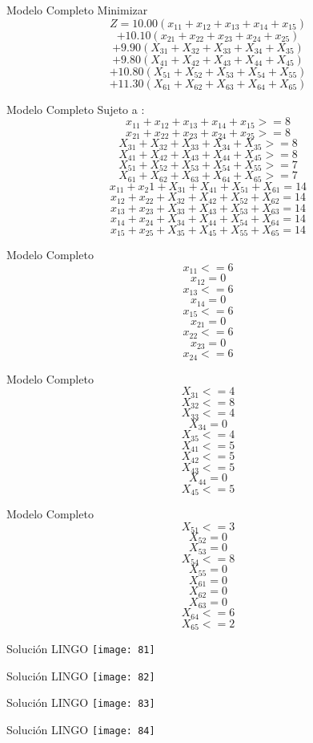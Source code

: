\documentclass{beamer}
\begin{document}
\begin{frame}[fragile]{Modelo Completo}
Minimizar\\
    \[Z = 10.00 (x_{11} + x_{12} +x_{13}+x_{14} +x_{15}) \]
      \[+ 10.10 (x_{21} + x_{22} +x_{23}+x_{24} + x_{25})\]
      \[+  9.90 (X_{31} + X_{32} +X_{33}+X_{34} +X_{35})\]
      \[+ 9.80  (X_{41} + X_{42} +X_{43}+X_{44} +X_{45})\]
      \[+ 10.80  (X_{51} + X_{52} +X_{53}+X_{54} +X_{55})\]
      \[+ 11.30  (X_{61} + X_{62} +X_{63}+X_{64} +X_{65})\]

\end{frame}

\begin{frame}[fragile]{Modelo Completo}
Sujeto a :\\
\[x_{11} + x_{12} +x_{13}+x_{14} +x_{15} >=8\]
\[x_{21} + x_{22} +x_{23}+x_{24} + x_{25} >= 8\]
\[X_{31} + X_{32} +X_{33}+X_{34} +X_{35} >= 8\]
\[X_{41} + X_{42} +X_{43}+X_{44} +X_{45} >= 8\]
\[X_{51} + X_{52} +X_{53}+X_{54} +X_{55} >= 7\]
\[X_{61} + X_{62} +X_{63}+X_{64} +X_{65} >= 7\]
\[x_{11} + x_{2}1 + X_{31} +X_{41} + X_{51} +X_{61} = 14  \]
\[x_{12} + x_{22} + X_{32} +X_{42} + X_{52} + X_{62} = 14\]
\[x_{13} + x_{23} + X_{33} +X_{43} + X_{53} +X_{63} = 14\]
\[x_{14} + x_{24} + X_{34} +X_{44} + X_{54} +X_{64} = 14\]
\[x_{15} + x_{25} + X_{35} +X_{45} + X_{55} +X_{65} = 14  \]
\end{frame}
\begin{frame}[fragile]{Modelo Completo}
\[x_{11} <= 6\]
        \[x_{12} = 0\]
        \[x_{13} <= 6\]
        \[x_{14}  = 0\]
        \[x_{15} <= 6\]
        \[x_{21} = 0 \]
        \[x_{22} <= 6\]
        \[x_{23} = 0\]
        \[x_{24}  <= 6\]
\end{frame}

\begin{frame}[fragile]{Modelo Completo}
\[X_{31} <= 4 \]
\[X_{32} <= 8\]
\[X_{33} <= 4\]
\[X_{34}  = 0\]
\[X_{35} <= 4\]
\[X_{41} <= 5 \]
\[X_{42} <= 5\]
\[X_{43} <= 5\]
\[X_{44} = 0\]
\[X_{45} <= 5\]
\end{frame}
\begin{frame}[fragile]{Modelo Completo}
\[X_{51} <= 3 \]
\[X_{52} = 0\]
\[X_{53} = 0\]
\[X_{54}  <=  8\]
\[X_{55} = 0\]
\[X_{61} = 0 \]
\[X_{62} = 0\]
\[X_{63} = 0\]
\[X_{64}  <=  6\]
\[X_{65} <= 2\]
\end{frame}

\begin{frame}[fragile]{Soluci\'on LINGO}
    \texttt{[image: 81]}
\end{frame}
\begin{frame}[fragile]{Soluci\'on LINGO}
    \texttt{[image: 82]}
\end{frame}
\begin{frame}[fragile]{Soluci\'on LINGO}
    \texttt{[image: 83]}
\end{frame}
\begin{frame}[fragile]{Soluci\'on LINGO}
    \texttt{[image: 84]}
\end{frame}
\end{document}
